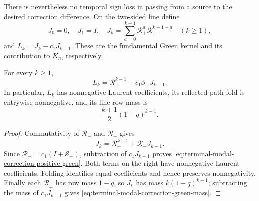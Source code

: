 There is nevertheless no temporal sign loss in passing from a source to the
desired correction difference.  On the two-sided line define
\begin{equation}
 J_0=0,\quad J_1=I,\quad
 J_k=\sum_{a=0}^{k-1}\mathcal R_+^a\mathcal R_-^{k-1-a}
 \quad(k\ge1),
 \label{eq:terminal-modal-correction-green}
\end{equation}
and $L_k=J_k-c_1J_{k-1}$.  These are the fundamental Green kernel and its
contribution to $K_n$, respectively.

\begin{lemma}
\label{lem:terminal-modal-correction-positive-green}
For every $k\ge1$,
\begin{equation}
 L_k=\mathcal R_+^{k-1}+c_1\mathcal S_-J_{k-1}.
 \label{eq:terminal-modal-correction-positive-green}
\end{equation}
In particular, $L_k$ has nonnegative Laurent coefficients, its reflected-path
fold is entrywise nonnegative, and its line-row mass is
\begin{equation}
 \frac{k+1}{2}(1-q)^{k-1}.
 \label{eq:terminal-modal-correction-green-mass}
\end{equation}
\end{lemma}

\begin{proof}
Commutativity of $\mathcal R_+$ and $\mathcal R_-$ gives
\[
 J_k=\mathcal R_+^{k-1}+\mathcal R_-J_{k-1}.
\]
Since $\mathcal R_-=c_1(I+\mathcal S_-)$, subtraction of
$c_1J_{k-1}$ proves
\eqref{eq:terminal-modal-correction-positive-green}.  Both terms on the
right have nonnegative Laurent coefficients.  Folding identifies equal
coefficients and hence preserves nonnegativity.  Finally each
$\mathcal R_\pm$ has row mass $1-q$, so
$J_k$ has mass $k(1-q)^{k-1}$; subtracting the mass of
$c_1J_{k-1}$ gives \eqref{eq:terminal-modal-correction-green-mass}.
\end{proof}

